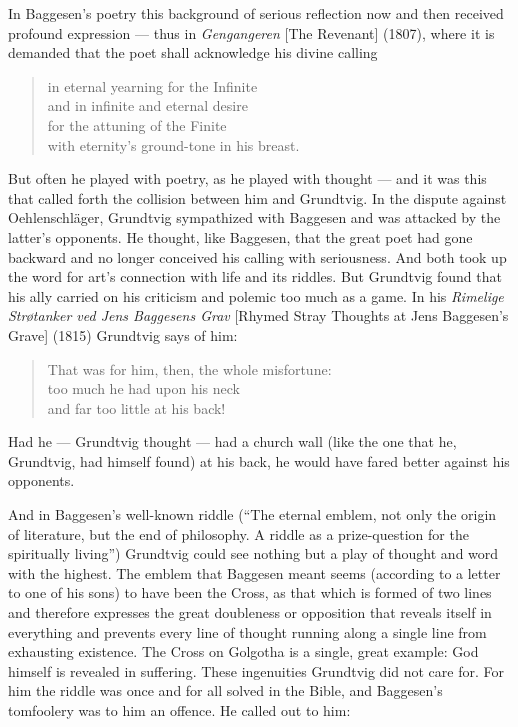 \documentclass[12pt,a4paper]{book}
\newcommand{\opage}[1]{\marginnote{\footnotesize\textit{[#1]}}}
\begin{document}
In Baggesen's poetry this background of serious reflection now and then received
profound expression --- thus in \emph{Gengangeren} [The Revenant] (1807), where it is
demanded that the poet shall acknowledge his divine calling

\begin{verse}
in eternal yearning for the Infinite\\
and in infinite and eternal desire\\
for the attuning of the Finite\\
with eternity's ground-tone in his breast.
\end{verse}

But often he played with poetry, as he played with thought --- and it was this that
called forth the collision between him and Grundtvig. In the dispute against
Oehlenschläger, Grundtvig sympathized with Baggesen and was attacked by the latter's
opponents. He thought, like Baggesen, that the great poet had gone backward and no
longer conceived his calling with seriousness. And both took up the word for art's
connection with life and its riddles. But Grundtvig found that his ally carried on his
criticism and polemic too much as a game. In his \emph{Rimelige Strøtanker ved Jens
Baggesens Grav} [Rhymed Stray Thoughts at Jens Baggesen's Grave] (1815) Grundtvig says
of him:

\begin{verse}
\opage{69}That was for him, then, the whole misfortune:\\
too much he had upon his neck\\
and far too little at his back!
\end{verse}

Had he --- Grundtvig thought --- had a church wall (like the one that he, Grundtvig,
had himself found) at his back, he would have fared better against his opponents.

And in Baggesen's well-known riddle (``The eternal emblem, not only the origin of
literature, but the end of philosophy. A riddle as a prize-question for the spiritually
living'') Grundtvig could see nothing but a play of thought and word with the highest.
The emblem that Baggesen meant seems (according to a letter to one of his sons) to have
been the Cross, as that which is formed of two lines and therefore expresses the great
doubleness or opposition that reveals itself in everything and prevents every line of
thought running along a single line from exhausting existence. The Cross on Golgotha is
a single, great example: God himself is revealed in suffering. These ingenuities
Grundtvig did not care for. For him the riddle was once and for all solved in the
Bible, and Baggesen's tomfoolery was to him an offence. He called out to him:
\end{document}
